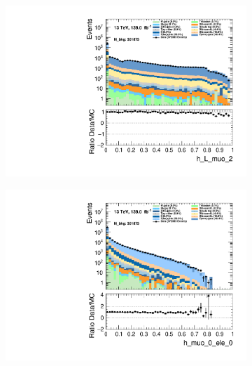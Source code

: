 \begin{figure}
    \centering
    \begin{subfigure}{.49\textwidth}
        \includegraphics[width=\textwidth]{Figures/MC_Data_comp/h_L_muo_2.pdf}
        \caption{}
        \label{fig:h_L_muo_2}
    \end{subfigure}
    \hfill
    \begin{subfigure}{.49\textwidth}
        \includegraphics[width=\textwidth]{Figures/MC_Data_comp/h_muo_0_ele_0.pdf}
        \caption{ }
        \label{fig:h_muo_0_ele_0}
    \end{subfigure}
    \hfill 
    \begin{subfigure}{.49\textwidth}

\end{subfigure}
\end{figure}

